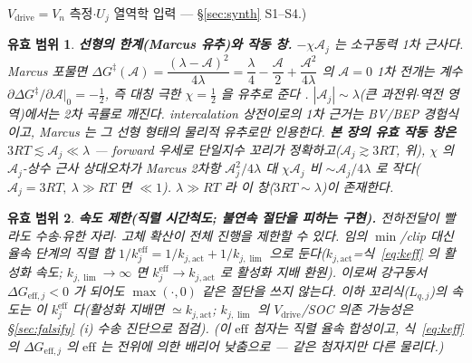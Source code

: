 \documentclass[11pt,a4paper]{article}
\newtheorem*{boundbox}{유효 범위}
\newcommand{\eff}{\mathrm{eff}}
\newcommand{\drive}{\mathrm{drive}}
\begin{document}
$V_\drive=V_n$ 측정$\cdot$$U_j$ 열역학 입력 — \S\ref{sec:synth} S1–S4.)
\begin{boundbox}
\textbf{선형의 한계(Marcus 유추)와 작동 창.} $-\chi\mathcal A_j$ 는 \emph{소구동력 1차} 근사다. Marcus 포물면
$\Delta G^\ddagger(\mathcal A)=\dfrac{(\lambda-\mathcal A)^2}{4\lambda}=\dfrac{\lambda}{4}-\dfrac{\mathcal A}{2}
+\dfrac{\mathcal A^2}{4\lambda}$ 의 $\mathcal A=0$ 1차 전개는 계수 $\partial\Delta G^\ddagger/\partial\mathcal A|_0
=-\tfrac12$, 즉 대칭 극한 $\chi=\tfrac12$ 을 \emph{유추}로 준다 \cite{marcus1956}. $|\mathcal A_j|\sim\lambda$(큰
과전위$\cdot$역전 영역)에서는 2차 곡률로 깨진다. \emph{intercalation 상전이로의 1차 근거는 BV/BEP 경험식이고,
Marcus 는 그 선형 형태의 물리적 유추로만 인용한다.} \textbf{본 장의 유효 작동 창은 $3RT\lesssim\mathcal A_j\ll\lambda$}
— forward 우세로 단일지수 꼬리가 정확하고($\mathcal A_j\gtrsim3RT$, 위), $\chi$ 의 $\mathcal A_j$-상수 근사 상대오차가 Marcus
2차항 $\mathcal A_j^2/4\lambda$ 대 $\chi\mathcal A_j$ 비 $\sim\mathcal A_j/4\lambda$ 로 작다($\mathcal A_j=3RT,\ \lambda\gg RT$ 면 $\ll1$).
$\lambda\gg RT$ 라 이 창($3RT\sim\lambda$)이 존재한다.
\end{boundbox}
\begin{boundbox}
\textbf{속도 제한(직렬 시간척도; 불연속 절단을 피하는 구현).} 전하전달이 빨라도 수송$\cdot$유한 자리$\cdot$
고체 확산이 전체 진행을 제한할 수 있다. 임의 $\min$/clip 대신 율속 단계의 직렬 합 $1/k_j^{\eff}=1/k_{j,\mathrm{act}}+1/k_{j,\lim}$
으로 둔다($k_{j,\mathrm{act}}$=식~\eqref{eq:keff} 의 활성화 속도; $k_{j,\lim}\to\infty$ 면 $k_j^{\eff}\to k_{j,\mathrm{act}}$ 로 활성화
지배 환원). 이로써 강구동서 $\Delta G_{\eff,j}<0$ 가 되어도 $\max(\cdot,0)$ 같은 절단을 쓰지 않는다. 이하 꼬리식($L_{q,j}$)의
속도는 이 $k_j^{\eff}$ 다(활성화 지배면 $\simeq k_{j,\mathrm{act}}$; $k_{j,\lim}$ 의 $V_\drive$/SOC 의존 가능성은 \S\ref{sec:falsify}
(i) 수송 진단으로 점검). (이 $\eff$ 첨자는 \emph{직렬 율속}
합성이고, 식~\eqref{eq:keff} 의 $\Delta G_{\eff,j}$ 의 $\eff$ 는 \emph{전위에 의한 배리어 낮춤}으로 — 같은 첨자지만 다른
물리다.)
\end{boundbox}
\end{document}

